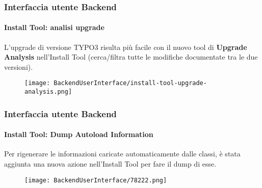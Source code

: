 \begin{frame}[fragile]
	\frametitle{Interfaccia utente Backend}
	\framesubtitle{Install Tool: analisi upgrade}


	L'upgrade di versione TYPO3 risulta più facile con il nuovo tool di \textbf{Upgrade Analysis}
	nell'Install Tool (cerca/filtra tutte le modifiche documentate tra le due versioni).

	\begin{figure}
		\texttt{[image: BackendUserInterface/install-tool-upgrade-analysis.png]}
	\end{figure}

\end{frame}


\begin{frame}[fragile]
	\frametitle{Interfaccia utente Backend}
	\framesubtitle{Install Tool: Dump Autoload Information}

	Per rigenerare le informazioni caricate automaticamente dalle classi, è stata aggiunta una nuova azione
	nell'Install Tool per fare il dump di esse.

	\begin{figure}
		\texttt{[image: BackendUserInterface/78222.png]}
	\end{figure}

\end{frame}


